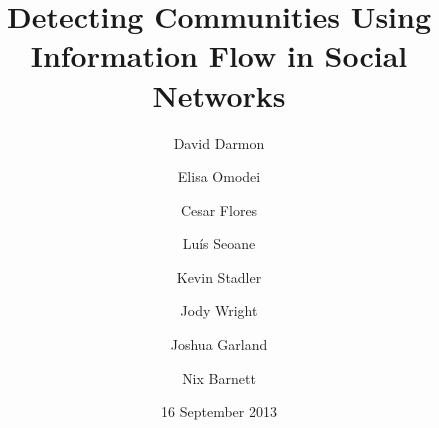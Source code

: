 \documentclass[12pt]{article}
\begin{document}
 
\title{Detecting Communities Using Information Flow in Social Networks} 

\author[1]{David Darmon}
\author[2]{Elisa Omodei}
\author[3]{Cesar Flores}
\author[4]{Lu\'{i}s Seoane}
\author[5]{Kevin Stadler}
\author[6]{Jody Wright}
\author[7]{Joshua Garland}
\author[8]{Nix Barnett}

\date{16 September 2013} 
\maketitle 
\end{document}
